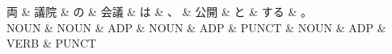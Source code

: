 \documentclass[tikz,border=5pt]{standalone}
\begin{document}
\normalsize
\begin{dependency}[edge unit distance=12.0pt]
    \begin{deptext}[column sep=1em]
        両 \& 議院 \& の \& 会議 \& は \& 、 \& 公開 \& と \& する \& 。\\
        NOUN \& NOUN \& ADP \& NOUN \& ADP \& PUNCT \& NOUN \& ADP \& VERB \& PUNCT\\
    \end{deptext}
\end{dependency}
\end{document}
